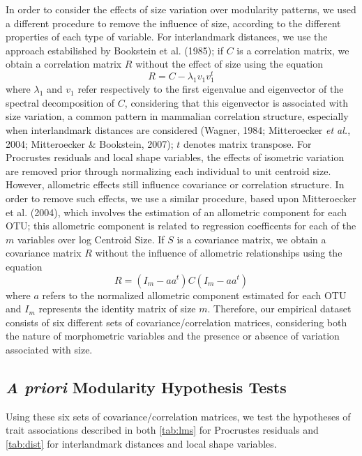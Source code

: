 \documentclass[12pt,]{article}
\begin{document}
In order to consider the effects of size variation over modularity
patterns, we used a different procedure to remove the influence of size,
according to the different properties of each type of variable. For
interlandmark distances, we use the approach estabilished by Bookstein
et al. (1985); if $C$ is a correlation matrix, we obtain a correlation
matrix $R$ without the effect of size using the equation \[
R = C - \lambda_1 v_1 v^{t}_1
\] where $\lambda_1$ and $v_1$ refer respectively to the first
eigenvalue and eigenvector of the spectral decomposition of $C$,
considering that this eigenvector is associated with size variation, a
common pattern in mammalian correlation structure, especially when
interlandmark distances are considered (Wagner, 1984; Mitteroecker
\emph{et al.}, 2004; Mitteroecker \& Bookstein, 2007); $t$ denotes
matrix transpose. For Procrustes residuals and local shape variables,
the effects of isometric variation are removed prior through normalizing
each individual to unit centroid size. However, allometric effects still
influence covariance or correlation structure. In order to remove such
effects, we use a similar procedure, based upon Mitteroecker et al.
(2004), which involves the estimation of an allometric component for
each OTU; this allometric component is related to regression coefficents
for each of the $m$ variables over log Centroid Size. If $S$ is a
covariance matrix, we obtain a covariance matrix $R$ without the
influence of allometric relationships using the equation \[
R = (I_m - aa^t) C (I_m - aa^t)
\] where $a$ refers to the normalized allometric component estimated for
each OTU and $I_m$ represents the identity matrix of size $m$.
Therefore, our empirical dataset consists of six different sets of
covariance/correlation matrices, considering both the nature of
morphometric variables and the presence or absence of variation
associated with size.

\subsection{\emph{A priori} Modularity Hypothesis
Tests}\label{a-priori-modularity-hypothesis-tests}

Using these six sets of covariance/correlation matrices, we test the
hypotheses of trait associations described in both \autoref{tab:lms} for
Procrustes residuals and \autoref{tab:dist} for interlandmark distances
and local shape variables.
\end{document}
